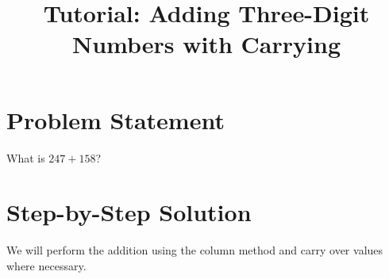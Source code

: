 \documentclass{article}
\begin{document}
\title{Tutorial: Adding Three-Digit Numbers with Carrying}
\author{}
\date{}
\maketitle

\section*{Problem Statement}
What is $247 + 158$?

\section*{Step-by-Step Solution}

We will perform the addition using the column method and carry over values where necessary.
\end{document}
